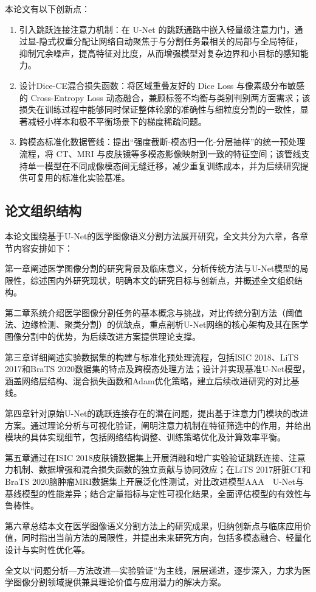本论文有以下创新点：

\begin{enumerate}
  \item 引入跳跃连接注意力机制：在 U-Net 的跳跃通路中嵌入轻量级注意力门，通过显-隐式权重分配让网络自动聚焦于与分割任务最相关的局部与全局特征，抑制冗余噪声，提高特征对比度，从而增强模型对复杂边界和小目标的感知能力。
  \item 设计Dice-CE混合损失函数：将区域重叠友好的 Dice Loss 与像素级分布敏感的 Cross-Entropy Loss 动态融合，兼顾标签不均衡与类别判别两方面需求；该损失在训练过程中能够同时保证整体轮廓的准确性与细粒度分割的一致性，显著减轻小样本和极不平衡场景下的梯度稀疏问题。
  \item 跨模态标准化数据管线：提出“强度截断-模态归一化-分层抽样”的统一预处理流程，将 CT、MRI 与皮肤镜等多模态影像映射到一致的特征空间；该管线支持单一模型在不同成像模态间无缝迁移，减少重复训练成本，并为后续研究提供可复用的标准化实验基准。
\end{enumerate}

\subsection{论文组织结构}

本论文围绕基于U-Net的医学图像语义分割方法展开研究，全文共分为六章，各章节内容安排如下：  

第一章阐述医学图像分割的研究背景及临床意义，分析传统方法与U-Net模型的局限性，综述国内外研究现状，明确本文的研究目标与创新点，并概述全文组织结构。  

第二章系统介绍医学图像分割任务的基本概念与挑战，对比传统分割方法（阈值法、边缘检测、聚类分割）的优缺点，重点剖析U-Net网络的核心架构及其在医学图像分割中的优势，为后续改进方案提供理论支撑。  

第三章详细阐述实验数据集的构建与标准化预处理流程，包括ISIC 2018、LiTS 2017和BraTS 2020数据集的特点及跨模态处理方法；设计并实现基准U-Net模型，涵盖网络层结构、混合损失函数和Adam优化策略，建立后续改进研究的对比基线。  

第四章针对原始U-Net的跳跃连接存在的潜在问题，提出基于注意力门模块的改进方案。通过理论分析与可视化验证，阐明注意力机制在特征筛选中的作用，并给出模块的具体实现细节，包括网络结构调整、训练策略优化及计算效率平衡。  

第五章通过在ISIC 2018皮肤镜数据集上开展消融和增广实验验证跳跃连接、注意力机制、数据增强和混合损失函数的独立贡献与协同效应；在LiTS 2017肝脏CT和BraTS 2020脑肿瘤MRI数据集上开展泛化性测试，对比改进模型AAA　U-Net与基线模型的性能差异；结合定量指标与定性可视化结果，全面评估模型的有效性与鲁棒性。  

第六章总结本文在医学图像语义分割方法上的研究成果，归纳创新点与临床应用价值，同时指出当前方法的局限性，并提出未来研究方向，包括多模态融合、轻量化设计与实时性优化等。  

全文以“问题分析—方法改进—实验验证”为主线，层层递进，逐步深入，力求为医学图像分割领域提供兼具理论价值与应用潜力的解决方案。